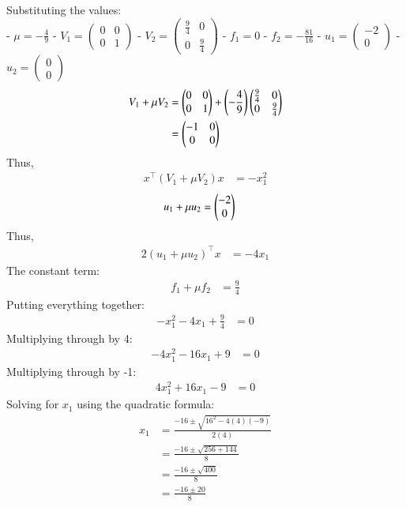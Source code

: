 \documentclass[journal]{IEEEtran}
\numberwithin{equation}{enumi}
\numberwithin{figure}{enumi}
\begin{document}
Substituting the values:\\
- $ \mu = -\frac{4}{9} $
- $ V_1 = \begin{pmatrix} 0 & 0 \\ 0 & 1 \end{pmatrix} $
- $ V_2 = \begin{pmatrix} \frac{9}{4} & 0 \\ 0 & \frac{9}{4} \end{pmatrix} $
- $ f_1 = 0 $
- $ f_2 = -\frac{81}{16} $
- $ u_1 = \begin{pmatrix} -2 \\ 0 \end{pmatrix} $
- $ u_2 = \begin{pmatrix} 0 \\ 0 \end{pmatrix} $
\begin{align}
V_1 + \mu V_2 &= \begin{pmatrix} 0 & 0 \\ 0 & 1 \end{pmatrix} + \left(-\frac{4}{9}\right) \begin{pmatrix} \frac{9}{4} & 0 \\ 0 & \frac{9}{4} \end{pmatrix} \\
&= \begin{pmatrix} -1 & 0 \\ 0 & 0 \end{pmatrix}
\end{align}
Thus, 
\begin{align}
x^\top (V_1 + \mu V_2) x &= -x_1^2
\end{align}
\begin{align}
u_1 + \mu u_2 &= \begin{pmatrix} -2 \\ 0 \end{pmatrix}
\end{align}
Thus, 
\begin{align}
2 (u_1 + \mu u_2)^\top x &= -4 x_1
\end{align}
The constant term:
\begin{align}
f_1 + \mu f_2 &= \frac{9}{4}
\end{align}
Putting everything together:
\begin{align}
-x_1^2 - 4x_1 + \frac{9}{4} &= 0
\end{align}
Multiplying through by 4:
\begin{align}
-4x_1^2 - 16x_1 + 9 &= 0
\end{align}
Multiplying through by -1:
\begin{align}
4x_1^2 + 16x_1 - 9 &= 0
\end{align}
Solving for $x_1$ using the quadratic formula:
\begin{align}
x_1 &= \frac{-16 \pm \sqrt{16^2 - 4(4)(-9)}}{2(4)} \\
&= \frac{-16 \pm \sqrt{256 + 144}}{8} \\
&= \frac{-16 \pm \sqrt{400}}{8} \\
&= \frac{-16 \pm 20}{8}
\end{align}
\end{document}
